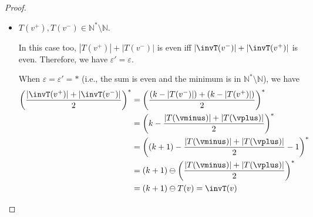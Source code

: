 \documentclass{article}\providecommand{\nequiv}{\not\equiv}\usepackage[a4paper,margin=20mm]{geometry}
\newcommand{\Nat}{\mathbb{N}}
\newcommand{\Natstro}{\mathbb{N}^* \setminus \mathbb{N}}
\newcommand{\eps}{\varepsilon}
\DeclarePairedDelimiter{\adjustfloor}{\lfloor}{\rfloor}
\newcommand{\floor}[1]{\adjustfloor*{#1}}
\begin{document}
\begin{proof}
\begin{itemize}
		First, from Observation~\ref{obs: property}, we have \(\invT(\vminus), \invT(\vplus) \in \Nat\) as well. 
		
		Thus, it is enough to discuss the two cases corresponding to when the sum is even or odd, respectively. 
		Note that  \(|T(v^+)|+|T(v^-)|\) is even iff \(|\invT(v^-)|+|\invT(v^+)|\) is even, simply because in this case \(\invT(\vplus) = (k+1) - T(\vplus)\) and \(\invT(\vminus) = (k+1) - T(\vminus)\). 
		It follows that irrespective of whether \(|T(\vminus)| + |T(\vplus)|\) is odd or even, we have \(\eps' = \eps\). 
		
		\smallskip
		
		When \(\eps = \eps' = 0\) (i.e., the sum is even), we have
		\begin{align*}
			\frac{|\invT(v^+)|+|\invT(v^-)|}{2} &= \frac{(k+1 - |T(v^-)|) + (k+1 - |T(v^+)|)}{2}\\
			&=k+1 - \frac{\sumT}{2}\\
			&= (k+1) - T(v) = \invT(v) 
		\end{align*}
		
		When \(\eps = \eps' = 0^*\) (i.e., the sum is odd), 
		we have 
		\begin{align*}
			\left(\floor{\frac{|\invT(v^+)|+|\invT(v^-)|}{2}}\right)^* &= \left(\floor{k+1 - \frac{\sumT}{2}}\right)^*\\
			&= \left(k+1 - \floor{\frac{\sumT}{2}} - 1\right)^*\\
			&= (k+1) \ominus \left(\floor{\frac{\sumT}{2}}\right)^*\\
			&= (k+1) \ominus T(v) = \invT(v) 
		\end{align*}
	
		\smallskip
		
		\item \(T(v^+), T(v^-) \in \Natstro\).
		
		In this case too, \(|T(v^+)|+|T(v^-)|\) is even iff  \(|\invT(v^-)|+|\invT(v^+)|\) is even.
		Therefore, we have \(\eps' = \eps\).
		
		When \(\eps = \eps' = *\) (i.e., the sum is even and the minimum is in \(\Natstro\)), we have 
		\begin{align*}
			\left(\frac{|\invT(v^+)|+|\invT(v^-)|}{2}\right)^* &= \left(\frac{(k - |T(v^-)|)+(k - |T(v^+)|)}{2}\right)^*\\
			&= \left(k - \frac{|T(\vminus)| + |T(\vplus)|}{2}\right)^* \\
			&= \left((k+1) - \frac{|T(\vminus)| + |T(\vplus)|}{2} - 1\right)^*\\
			&= (k+1) \ominus \left(\frac{|T(\vminus)| + |T(\vplus)|}{2}\right)^*\\
			&= (k+1) \ominus T(v) = \invT(v) 
		\end{align*}
		

\end{itemize}
\end{proof}
\end{document}
